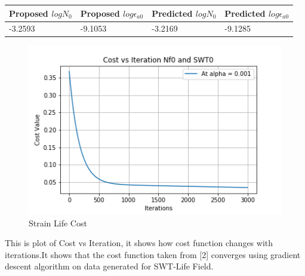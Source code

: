\documentclass[11pt]{article}
\begin{document}
\begin{longtable}[]{@{}llll@{}}
\toprule
\begin{minipage}[b]{0.22\columnwidth}\raggedright
Proposed \(logN_0\)\strut
\end{minipage} & \begin{minipage}[b]{0.22\columnwidth}\raggedright
Proposed \(log\epsilon_{a0}\)\strut
\end{minipage} & \begin{minipage}[b]{0.22\columnwidth}\raggedright
Predicted \(logN_0\)\strut
\end{minipage} & \begin{minipage}[b]{0.22\columnwidth}\raggedright
Predicted \(log\epsilon_{a0}\)\strut
\end{minipage}\tabularnewline
\midrule
\endhead
\begin{minipage}[t]{0.22\columnwidth}\raggedright
-3.2593\strut
\end{minipage} & \begin{minipage}[t]{0.22\columnwidth}\raggedright
-9.1053\strut
\end{minipage} & \begin{minipage}[t]{0.22\columnwidth}\raggedright
-3.2169\strut
\end{minipage} & \begin{minipage}[t]{0.22\columnwidth}\raggedright
-9.1285\strut
\end{minipage}\tabularnewline
\bottomrule
\end{longtable}

\begin{figure}
\centering
\includegraphics{images/costviterswt.png}
\caption{Strain Life Cost}
\end{figure}

This is plot of Cost vs Iteration, it shows how cost function changes
with iterations.It shows that the cost function taken from {[}2{]}
converges using gradient descent algorithm on data generated for
SWT-Life Field.
\end{document}

